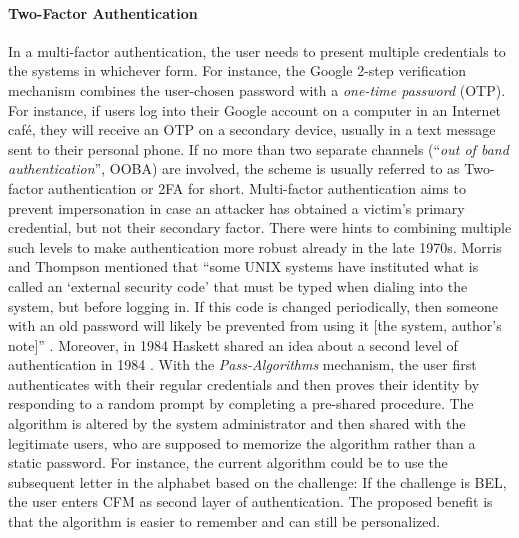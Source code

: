 	\paragraph{Two-Factor Authentication}
	In a multi-factor authentication, the user needs to present multiple credentials to the systems in whichever form. For instance, the Google 2-step verification mechanism combines the user-chosen password with a \textit{one-time password} (OTP). For instance, if users log into their Google account on a computer in an Internet café, they will receive an OTP on a secondary device, usually in a text message sent to their personal phone. If no more than two separate channels (``\textit{out of band authentication}'', OOBA) are involved, the scheme is usually referred to as Two-factor authentication or 2FA for short. Multi-factor authentication aims to prevent impersonation in case an attacker has obtained a victim's primary credential, but not their secondary factor. 
	There were hints to combining multiple such levels to make authentication more robust already in the late 1970s. Morris and Thompson mentioned that ``some UNIX systems have instituted what is called an `external security code' that must be typed when dialing into the system, but before logging in. If this code is changed periodically, then someone with an old password will likely be prevented from using it [the system, author's note]'' \cite{Morris1979PasswordSecurity}. Moreover, in 1984 Haskett shared an idea about a second level of authentication in 1984 \cite{Haskett1984PassAlgorithms}. With the \textit{Pass-Algorithms} mechanism, the user first authenticates with their regular credentials and then proves their identity by responding to a random prompt by completing a pre-shared procedure. The algorithm is altered by the system administrator and then shared with the legitimate users, who are supposed to memorize the algorithm rather than a static password. For instance, the current algorithm could be to use the subsequent letter in the alphabet based on the challenge: If the challenge is BEL, the user enters CFM as second layer of authentication. The proposed benefit is that the algorithm is easier to remember and can still be personalized. 
